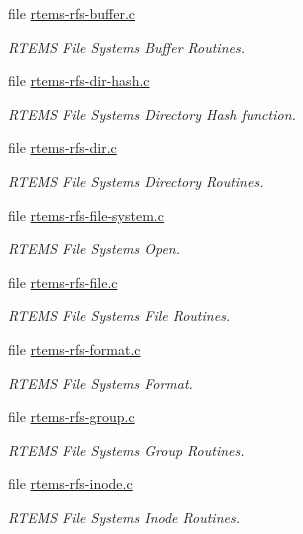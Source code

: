 \begin{DoxyCompactItemize}
file \mbox{\hyperlink{rtems-rfs-buffer_8c}{rtems-\/rfs-\/buffer.\+c}}
\begin{DoxyCompactList}\small\item\em R\+T\+E\+MS File Systems Buffer Routines. \end{DoxyCompactList}\item 
file \mbox{\hyperlink{rtems-rfs-dir-hash_8c}{rtems-\/rfs-\/dir-\/hash.\+c}}
\begin{DoxyCompactList}\small\item\em R\+T\+E\+MS File Systems Directory Hash function. \end{DoxyCompactList}\item 
file \mbox{\hyperlink{rtems-rfs-dir_8c}{rtems-\/rfs-\/dir.\+c}}
\begin{DoxyCompactList}\small\item\em R\+T\+E\+MS File Systems Directory Routines. \end{DoxyCompactList}\item 
file \mbox{\hyperlink{rtems-rfs-file-system_8c}{rtems-\/rfs-\/file-\/system.\+c}}
\begin{DoxyCompactList}\small\item\em R\+T\+E\+MS File Systems Open. \end{DoxyCompactList}\item 
file \mbox{\hyperlink{rtems-rfs-file_8c}{rtems-\/rfs-\/file.\+c}}
\begin{DoxyCompactList}\small\item\em R\+T\+E\+MS File Systems File Routines. \end{DoxyCompactList}\item 
file \mbox{\hyperlink{rtems-rfs-format_8c}{rtems-\/rfs-\/format.\+c}}
\begin{DoxyCompactList}\small\item\em R\+T\+E\+MS File Systems Format. \end{DoxyCompactList}\item 
file \mbox{\hyperlink{rtems-rfs-group_8c}{rtems-\/rfs-\/group.\+c}}
\begin{DoxyCompactList}\small\item\em R\+T\+E\+MS File Systems Group Routines. \end{DoxyCompactList}\item 
file \mbox{\hyperlink{rtems-rfs-inode_8c}{rtems-\/rfs-\/inode.\+c}}
\begin{DoxyCompactList}\small\item\em R\+T\+E\+MS File Systems Inode Routines. \end{DoxyCompactList}\item 

\end{DoxyCompactItemize}
